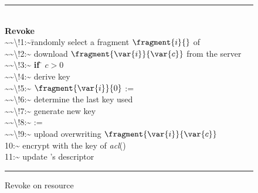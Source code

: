 \begin{figure}[!t]
\begin{small}
\hrule          %
\begin{tabbing}
\hfill\\
{\bf Revoke}\\[1em]
\num{~~\!1:~}\= randomly select a fragment $\fragment{i}{}$ of \resource  {}\\[0.3em]
\num{~~\!2:~} \1 download $\fragment{\var{i}}{\var{c}}$ from the server \\[0.3em]
\num{~~\!3:~} \1 {\bf if} \= $c> 0$ \mythen {} \\[0.3em]
\num{~~\!4:~} \2 derive key  \\[0.3em]
\num{~~\!5:~}  \2 $\fragment{\var{i}}{0}$ :=  \\[0.3em]
\num{~~\!6:~} \1 determine the last key  used   \\[0.3em]
\num{~~\!7:~} \1 generate new key  \\[0.3em]
\num{~~\!8:~} \1  := \\[0.3em]
\num{~~\!9:~} \1 upload  overwriting $\fragment{\var{i}}{\var{c}}$ \\[0.3em]
\num{10:~} \1 encrypt  with the key of {\em acl\/}(\resource) \\[0.3em]
\num{11:~} \1 update  \resource's descriptor 
\end{tabbing}
\hrule
\vspace{.5em}
\end{small}
\caption{\label{ms:fig:revoke}Revoke on resource \resource}
\end{figure}

